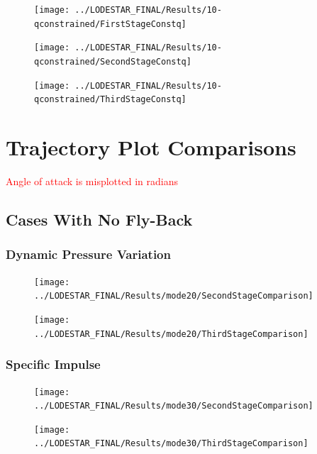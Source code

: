 \begin{figure}[th]
\centering
\texttt{[image: ../LODESTAR\_FINAL/Results/10-qconstrained/FirstStageConstq]}
\caption{}
\label{fig:FirstStageqConstrained68}
\end{figure}
		
\begin{figure}[th]
\centering
\texttt{[image: ../LODESTAR\_FINAL/Results/10-qconstrained/SecondStageConstq]}
\caption{}
\label{fig:SecondStageqConstrained68}
\end{figure}

\begin{figure}[th]
\centering
\texttt{[image: ../LODESTAR\_FINAL/Results/10-qconstrained/ThirdStageConstq]}
\caption{}
\label{fig:ThirdStageqConstrained68}
\end{figure}



		
		\chapter{Trajectory Plot Comparisons}\label{sec:Appendix_trajectorycomparisons}
		
		\textcolor{red}{Angle of attack is misplotted in radians}
		
		\section{Cases With No Fly-Back}
		
		\subsection{Dynamic Pressure Variation}
		
		
\begin{figure}[!ht]
\centering
\texttt{[image: ../LODESTAR\_FINAL/Results/mode20/SecondStageComparison]}
\caption{}
\label{fig:SecondStageComparison1}
\end{figure}

\begin{figure}[!th]
\centering
\texttt{[image: ../LODESTAR\_FINAL/Results/mode20/ThirdStageComparison]}
\caption{}
\label{fig:ThirdStageComparison1}
\end{figure}
\FloatBarrier
\subsection{Specific Impulse}


\begin{figure}[!th]
\centering
\texttt{[image: ../LODESTAR\_FINAL/Results/mode30/SecondStageComparison]}
\caption{}
\label{fig:SecondStageComparison2}

\end{figure}
\begin{figure}[!th]
\centering
\texttt{[image: ../LODESTAR\_FINAL/Results/mode30/ThirdStageComparison]}
\caption{}
\label{fig:ThirdStageComparison2}
\end{figure}
\FloatBarrier
